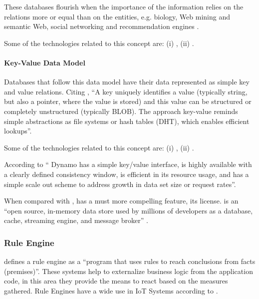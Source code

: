These databases flourish when the importance of the information relies on the relations more or equal than on the entities, e.g. biology, Web mining and semantic Web, social networking and recommendation engines \parencite{angles2012comparison, miller2013graph}.

Some of the technologies related to this concept are: (i) , (ii) .

\paragraph{Key-Value Data Model}
\label{par:stateofart:arch:infra:store:key}

Databases that follow this data model have their data represented as simple key and value relations. Citing \cite{pokorny2011nosql}, ``A key uniquely identifies a value (typically string, but also a pointer, where the value is stored) and this value can be structured or completely unstructured (typically BLOB). The approach key-value reminds simple abstractions as file systems or hash tables (DHT), which enables efficient lookups''.

Some of the technologies related to this concept are: (i) , (ii) .

According to \cite{decandia2007dynamo} `` Dynamo has a simple key/value interface, is highly available with a clearly defined consistency window, is efficient in its resource usage, and has a simple scale out scheme to address growth in data set size or request rates''.

When compared with ,  has a must more compelling feature, its license.  is an ``open source, in-memory data store used by millions of developers as a database, cache, streaming engine, and message broker'' \parencite{redis}.

\subsubsection{Rule Engine}
\label{subsubsec:stateofart:arch:infra:rule}

\cite{CHISHOLM20041} defines a rule engine as a ``program that uses rules to reach conclusions from facts (premises)''. These systems help to externalize business logic from the application code, in this area they provide the means to react based on the measures gathered. 
Rule Engines have a wide use in \gls{IoT} Systems according to \cite{LUO2021220, Milenkovic2020, 8938723}.

